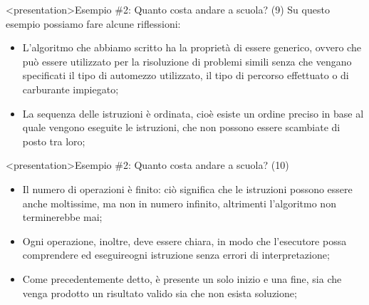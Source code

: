 \documentclass[
    notheorems,
    11pt,
    compress,
    aspectratio=169
]{beamer}
\begin{document}
\begin{frame}<presentation>{Esempio \#2: Quanto costa andare a scuola? (9)}
    Su questo esempio possiamo fare alcune riflessioni:

    \begin{itemize}
        \item L’algoritmo che abbiamo scritto ha la proprietà di essere generico, ovvero che può essere utilizzato per la risoluzione di problemi simili senza che vengano specificati il tipo di automezzo utilizzato, il tipo di percorso effettuato o di carburante impiegato;

        \pause

        \item La sequenza delle istruzioni è ordinata, cioè esiste un ordine preciso in base al quale vengono eseguite le istruzioni, che non possono essere scambiate di posto tra loro;
    \end{itemize}
\end{frame}

\begin{frame}<presentation>{Esempio \#2: Quanto costa andare a scuola? (10)}
    \begin{itemize}
        \item Il numero di operazioni è finito: ciò significa che le istruzioni possono essere anche moltissime, ma non in numero infinito, altrimenti l’algoritmo non terminerebbe mai;

        \pause

        \item Ogni operazione, inoltre, deve essere chiara, in modo che l’esecutore possa comprendere ed eseguireogni istruzione senza errori di interpretazione;

        \pause

        \item Come precedentemente detto, è presente un solo inizio e una fine, sia che venga prodotto un risultato valido sia che non esista soluzione;
    \end{itemize}
\end{frame}
\end{document}
